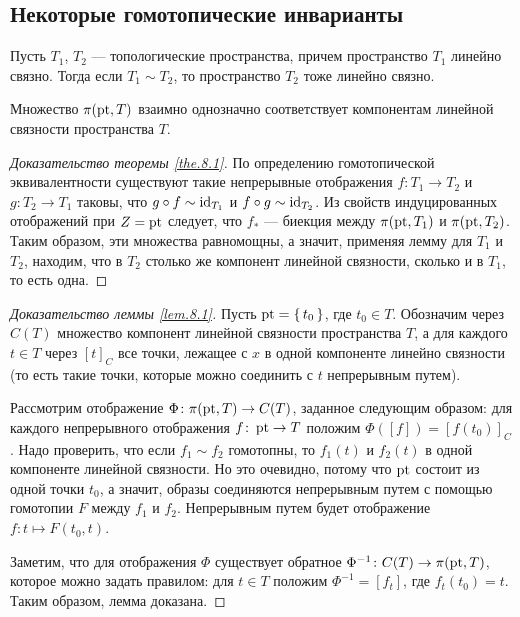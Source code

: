 \documentclass[main]{subfiles}
\begin{document}
\subsection{Некоторые гомотопические инварианты}

\begin{theorem} \label{the.8.1}
	Пусть $ T_1 $, $ T_2 $ --- топологические пространства, причем пространство $ T_1 $ линейно связно. Тогда
	если $ T_1 \sim T_2 $, то пространство $ T_2 $ тоже линейно связно.
\end{theorem}

\begin{lemma} \label{lem.8.1}
	Множество $ \pi(\operatorname{pt}, T) $ взаимно однозначно соответствует компонентам линейной связности пространства $ T $.
\end{lemma}

\begin{proof}[Доказательство теоремы \ref{the.8.1}]
	По определению гомотопической эквивалентности существуют такие непрерывные отображения $ f \colon T_1 \to T_2 $ и
	$ g \colon T_2 \to T_1 $ таковы, что $ g \circ f \sim \operatorname{id}_{T_1} $ и $ f \circ g \sim \operatorname{id}_{T_2} $.
	Из свойств индуцированных отображений при $ Z = \operatorname{pt} $ следует, что $ f_* $ --- биекция между $ \pi(\operatorname{pt}, T_1) $ и
	$ \pi(\operatorname{pt}, T_2) $. Таким образом, эти множества равномощны, а значит, применяя лемму для $ T_1 $ и $ T_2 $,
	находим, что в $ T_2 $ столько же компонент линейной связности, сколько и в $ T_1 $, то есть одна.
\end{proof}

\begin{proof}[Доказательство леммы \ref{lem.8.1}]
	Пусть $ \operatorname{pt} = \left\{\,t_0\,\right\} $, где $ t_0 \in T $. Обозначим через $ C(T) $ множество компонент линейной связности
	пространства $ T $, а для каждого $ t \in T $ через $ [t]_C $ все точки, лежащее с $ x $ в одной компоненте
	линейно связности (то есть такие точки, которые можно соединить с $ t $ непрерывным путем).

	Рассмотрим отображение $ \Phi \colon \pi(\operatorname{pt}, T) \to C(T) $, заданное следующим образом: для каждого
	непрерывного отображения $ f \colon \operatorname{pt} \to T $ положим $ \Phi([f]) = [f(t_0)]_C $. Надо проверить,
	что если $ f_1 \sim f_2 $ гомотопны, то $ f_1(t) $ и $ f_2(t) $ в одной компоненте линейной связности.
	Но это очевидно, потому что $ \operatorname{pt} $ состоит из одной точки $ t_0 $, а значит,
	образы соединяются непрерывным путем с помощью гомотопии $ F $ между $ f_1 $ и $ f_2 $.
	Непрерывным путем будет отображение $ f \colon t \mapsto F(t_0, t) $.

	Заметим, что для отображения $ \Phi $ существует обратное $ \Phi^{-1} \colon C(T) \to \pi(\operatorname{pt}, T) $, которое
	можно задать правилом: для $ t \in T $ положим $ \Phi^{-1} = [f_t] $, где $ f_t(t_0) = t $. Таким образом,
	лемма доказана.
\end{proof}
\end{document}

